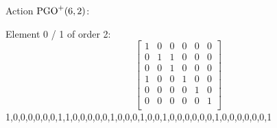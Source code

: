 Action ${\rm PGO}^+(6,2)$:\\

\bigskip

Element     0 / 1 of order 2:
$$
\left[
\begin{array}{*{6}{r}}
1 & 0 & 0 & 0 & 0 & 0\\
0 & 1 & 1 & 0 & 0 & 0\\
0 & 0 & 1 & 0 & 0 & 0\\
1 & 0 & 0 & 1 & 0 & 0\\
0 & 0 & 0 & 0 & 1 & 0\\
0 & 0 & 0 & 0 & 0 & 1\\
\end{array}
\right]
$$
1,0,0,0,0,0,0,1,1,0,0,0,0,0,1,0,0,0,1,0,0,1,0,0,0,0,0,0,1,0,0,0,0,0,0,1\\
